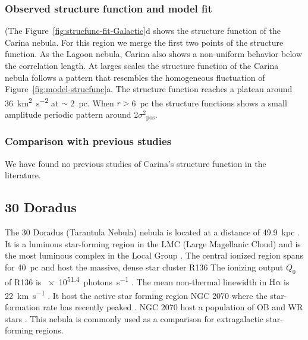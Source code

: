 \documentclass[fleqn,usenatbib, useAMS, a4paper]{mnras}
\newcommand\pos{\ensuremath{_{\mathrm{pos}}}}
\newcommand\ha{\ensuremath{\text{H}\alpha}}
\begin{document}
\subsubsection{Observed structure function and model fit}
\label{sec:observ-struct-funct-carina}

(The Figure~\ref{fig:strucfunc-fit-Galactic}d shows the structure function of the Carina nebula.
For this region we merge the first two points of the structure function.
As the Lagoon nebula, Carina also shows a non-uniform behavior below the correlation length.
At larges scales the structure function of the Carina nebula follows a pattern that resembles the homogeneous fluctuation of Figure~\ref{fig:model-strucfunc}a.
The structure function reaches a plateau around \SI{36}{km^{2}.s^{-2}} at \(\sim\) \SI{2}{pc}.
When \(r >\)\SI{6}{pc} the structure functions shows a small amplitude periodic pattern around 2\(\sigma^2\pos\).


\subsubsection{Comparison with previous studies}
\label{sec:comparison-carina}

We have found no previous studies of Carina's structure function in the literature.

\subsection{30 Doradus}
\label{sec:30-doradus}

The 30 Doradus (Tarantula Nebula) nebula is located at a distance of \SI{49.9}{kpc} \citetext{\SI{1}{\arcsecond} = \SI{0.24}{pc} ; \citealp{2013Natur.495...76P}}.
It is a luminous star-forming region in the LMC (Large Magellanic Cloud) and is the most luminous complex in the Local Group \citep{1984ApJ...287..116K}.
The central ionized region spans for \SI{40}{pc} and host the massive, dense star cluster R136 %
The ionizing output \(Q_0\) of R136 is \SI{e51.4}{photons.s^{-1}} \citep{2020MNRAS.499.1918B}.
The mean non-thermal linewidth in \ha{} is \SI{22}{km.s^{-1}} \citep{2013A&A...555A..60T}.
It host the active star forming region NGC 2070 \citep{2013AJ....145...98W} where the star-formation rate has recently peaked \citep{2015ApJ...811...76C}. 
NGC 2070 host a population of OB and WR stars \citep{2011A&A...530A.108E}.
This nebula is commonly used as a comparison for extragalactic star-forming regions.
\end{document}
